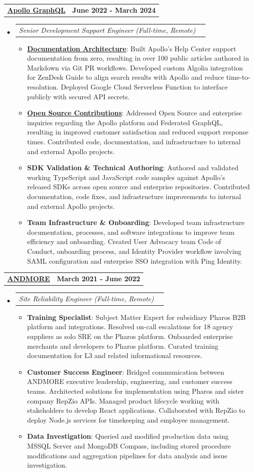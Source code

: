 \documentclass[letterpaper,10.8pt]{article}
\makeatletter
\newcommand{\resumeItem}[2]{
  \item\small{
    \textbf{#1}{: #2 \vspace{-2pt}}
  }
}
\newcommand{\jobLineItem}[2]{
  \vspace{0pt}\item[]
    \begin{tabular*}{0.98\textwidth}{l@{\extracolsep{\fill}}r}
      \textit{#1} & \textit{\small #2} \\
    \end{tabular*}\vspace{-4pt}
}
\newcommand{\employerTitle}[3]{
  \begin{tabular*}{1\textwidth}{l@{\extracolsep{\fill}}r}
    \href{#1}{\textbf{#2}} & \textbf{#3} \\
  \end{tabular*}\vspace{-4pt}
}
\newcommand{\resumeSubHeadingListStart}{\begin{itemize}[leftmargin=*]}
\newcommand{\resumeSubHeadingListEnd}{\end{itemize}}
\newcommand{\resumeItemListStart}{\begin{itemize}}
\newcommand{\resumeItemListEnd}{\end{itemize}\vspace{-5pt}}
\makeatother
\begin{document}
  \employerTitle
    {https://apollographql.com}{Apollo GraphQL}{June 2022 - March 2024}
  \resumeSubHeadingListStart
    \jobLineItem
      {Senior Development Support Engineer (Full-time, Remote)}{}
      \resumeItemListStart
        \resumeItem{\href{https://support.apollographql.com/}{Documentation Architecture}}{Built Apollo’s Help Center support documentation from zero, resulting in over 100 public articles authored in Markdown via Git PR workflows. Developed custom Algolia integration for ZenDesk Guide to align search results with Apollo and reduce time-to-resolution. Deployed Google Cloud Serverless Function to interface publicly with secured API secrets.}
        \resumeItem{\href{https://stackoverflow.com/users/9281567/kyle-obrien}{Open Source Contributions}}{Addressed Open Source and enterprise inquiries regarding the Apollo platform and Federated GraphQL, resulting in improved customer satisfaction and reduced support response times. Contributed code, documentation, and infrastructure to internal and external Apollo projects.}
        \resumeItem{SDK Validation \& Technical Authoring}{Authored and validated working TypeScript and JavaScript code samples against Apollo’s released SDKs across open source and enterprise repositories. Contributed documentation, code fixes, and infrastructure improvements to internal and external Apollo projects.}
        \resumeItem{Team Infrastructure \& Onboarding}{Developed team infrastructure documentation, processes, and software integrations to improve team efficiency and onboarding. Created User Advocacy team Code of Conduct, onboarding process, and Identity Provider workflow involving SAML configuration and enterprise SSO integration with Ping Identity.}
      \resumeItemListEnd
  \resumeSubHeadingListEnd

  \employerTitle
    {https://www.andmore.com/}{ANDMORE}{March 2021 - June 2022}
  \resumeSubHeadingListStart
    \jobLineItem
      {Site Reliability Engineer (Full-time, Remote)}{}
      \resumeItemListStart
        \resumeItem{Training Specialist}{Subject Matter Expert for subsidiary Pharos B2B platform and integrations. Resolved on-call escalations for 18 agency suppliers as solo SRE on the Pharos platform. Onboarded enterprise merchants and developers to Pharos platform. Curated training documentation for L3 and related informational resources.}
        \resumeItem{Customer Success Engineer}{Bridged communication between ANDMORE executive leadership, engineering, and customer success teams. Architected solutions for implementation using Pharos and sister company RepZio APIs. Managed product lifecycle working with stakeholders to develop React applications. Collaborated with RepZio to deploy Node.js services for timekeeping and employee management.}
        \resumeItem{Data Investigation}{Queried and modified production data using MSSQL Server and MongoDB Compass, including stored procedure modifications and aggregation pipelines for data analysis and issue investigation.}
      \resumeItemListEnd
  \resumeSubHeadingListEnd
\end{document}
